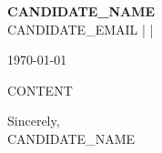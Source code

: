 \documentclass[11pt,a4paper]{article}
\begin{document}
\begin{flushleft}
{\large\bfseries {{CANDIDATE_NAME}}}\\[2pt]
{\small {{CANDIDATE_EMAIL}} \quad |  \quad | }
\end{flushleft}

\vspace{12pt}

\begin{flushleft}
{\small\today}
\end{flushleft}

\vspace{12pt}

\noindent
{{CONTENT}}

\vspace{24pt}

\noindent
Sincerely,\\[12pt]
{{CANDIDATE_NAME}}
\end{document}

